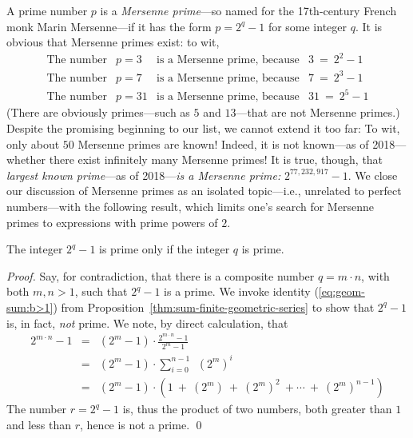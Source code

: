 A prime number $p$ is a {\it Mersenne prime}---so named for the
17th-century French monk Marin 
 Mersenne---if it has the form $p
= 2^q -1$ for some integer $q$.  It is obvious that Mersenne primes
exist: to wit,
\begin{equation}
\label{eq:sample-mersennes}
\begin{array}{lclc}
\mbox{The number} & p=3 & 
  \mbox{is a Mersenne prime, because} & 3 \ = \ 2^2 -1 \\
\mbox{The number} & p=7 &
  \mbox{is a Mersenne prime, because} & 7 \ = \ 2^3 -1 \\
\mbox{The number} & p=31 &
  \mbox{is a Mersenne prime, because} & 31 \ = \ 2^5 -1
\end{array}
\end{equation}
(There are obviously primes---such as $5$ and $13$---that are not
Mersenne primes.)  Despite the promising beginning to our list, we
cannot extend it too far: To wit, only about $50$ Mersenne primes are
known!  Indeed, it is not known---as of 2018---whether there exist
infinitely many Mersenne primes!  It is true, though, that {\em
  largest known prime}---as of 2018---{\em is a Mersenne prime:}
$2^{77,232,917} -1$.   We close our
discussion of Mersenne primes as an isolated topic---i.e., unrelated
to perfect numbers---with the following result, which limits one's
search for Mersenne primes to expressions with prime powers of $2$.


\begin{prop}
\label{thm:Mersenne-needs-prime-exponent}
The integer $2^q -1$ is prime only if the integer $q$ is prime.
\end{prop}

\begin{proof}
Say, for contradiction, that there is a composite number $q = m \cdot
n$, with both $m, n > 1$, such that $2^q -1$ is a prime.  We invoke
identity (\ref{eq:geom-sum:b>1}) from
Proposition~\ref{thm:sum-finite-geometric-series} to show that $2^q
-1$ is, in fact, {\em not} prime.  We note, by direct calculation,
that
\begin{eqnarray}
\nonumber
2^{m \cdot n} -1 & = & (2^m -1) \cdot \frac{2^{m \cdot n} -1}{2^m -1} \\
\nonumber
  & = & (2^m -1) \cdot \sum_{i=0}^{n-1} \ \ (2^m)^{i} \\
\label{eq:Mersenne-factors}
  & = & (2^m -1) \cdot \left( 1 \ + \ (2^m) \ + \ (2^m)^2 \ + \cdots
            \ + \ (2^m)^{n-1} \right)
\end{eqnarray}
The number $r = 2^q - 1$ is, thus the product of two numbers, both
greater than $1$ and less than $r$, hence is not a prime.
\qed
\end{proof}

